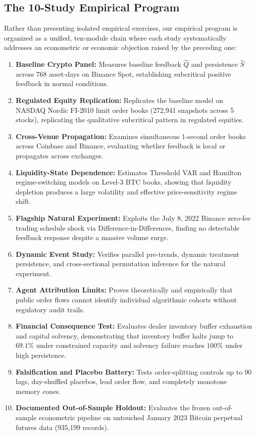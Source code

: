 \documentclass[12pt]{article}
\theoremstyle{definition}
\theoremstyle{remark}
\begin{document}
\subsection{The 10-Study Empirical Program}
Rather than presenting isolated empirical exercises, our empirical program is organized as a unified, ten-module chain where each study systematically addresses an econometric or economic objection raised by the preceding one:
\begin{enumerate}[label=\arabic*.]
    \item \textbf{Baseline Crypto Panel:} Measures baseline feedback $\hat{Q}$ and persistence $\hat{S}$ across 768 asset-days on Binance Spot, establishing subcritical positive feedback in normal conditions.
    \item \textbf{Regulated Equity Replication:} Replicates the baseline model on NASDAQ Nordic FI-2010 limit order books (272,941 snapshots across 5 stocks), replicating the qualitative subcritical pattern in regulated equities.
    \item \textbf{Cross-Venue Propagation:} Examines simultaneous 1-second order books across Coinbase and Binance, evaluating whether feedback is local or propagates across exchanges.
    \item \textbf{Liquidity-State Dependence:} Estimates Threshold VAR and Hamilton regime-switching models on Level-3 BTC books, showing that liquidity depletion produces a large volatility and effective price-sensitivity regime shift.
    \item \textbf{Flagship Natural Experiment:} Exploits the July 8, 2022 Binance zero-fee trading schedule shock via Difference-in-Differences, finding no detectable feedback response despite a massive volume surge.
    \item \textbf{Dynamic Event Study:} Verifies parallel pre-trends, dynamic treatment persistence, and cross-sectional permutation inference for the natural experiment.
    \item \textbf{Agent Attribution Limits:} Proves theoretically and empirically that public order flows cannot identify individual algorithmic cohorts without regulatory audit trails.
    \item \textbf{Financial Consequence Test:} Evaluates dealer inventory buffer exhaustion and capital solvency, demonstrating that inventory buffer halts jump to $69.1\%$ under constrained capacity and solvency failure reaches $100\%$ under high persistence.
    \item \textbf{Falsification and Placebo Battery:} Tests order-splitting controls up to 90 lags, day-shuffled placebos, lead order flow, and completely monotone memory cones.
    \item \textbf{Documented Out-of-Sample Holdout:} Evaluates the frozen out-of-sample econometric pipeline on untouched January 2023 Bitcoin perpetual futures data (935,199 records).
\end{enumerate}
\end{document}
